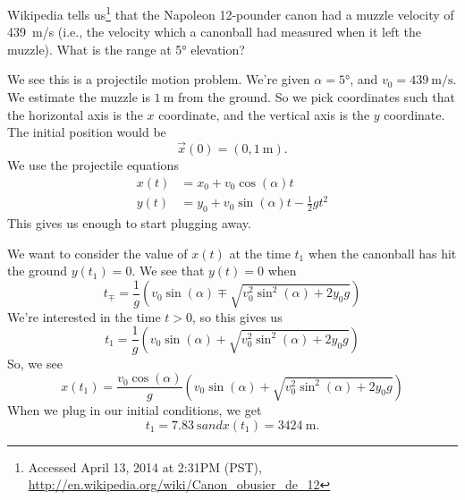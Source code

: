 Wikipedia tells us\footnote{Accessed April 13, 2014 at 2:31PM (PST), \url{http://en.wikipedia.org/wiki/Canon_obusier_de_12}}
that the Napoleon 12-pounder canon had a muzzle velocity of
\SI{439}{\meter/\second} (i.e., the velocity which a canonball had
measured when it left the muzzle). What is the range at \ang{5} elevation?

\begin{soln}
\IDandSETUP
We see this is a projectile motion
problem. We're given $\alpha=\ang{5}$, and
$v_{0}=\SI{439}{\meter/\second}$. We estimate the muzzle is
$\SI{1}{\meter}$ from the ground. So we pick coordinates such that the
horizontal axis is the $x$ coordinate, and the vertical axis is the $y$
coordinate. The initial position would be
\begin{equation}
\vec{x}(0)=(0,\SI{1}{\meter}).
\end{equation}
We use the projectile equations
\begin{equation*}
\begin{split}
x(t) &= x_{0} + v_{0}\cos(\alpha)t\\
y(t) &= y_{0} + v_{0}\sin(\alpha)t - \frac{1}{2}gt^{2}
\end{split}
\end{equation*}
This gives us enough to start plugging away.

\EXECUTE
We want to consider the value of $x(t)$ at the time $t_{1}$ when the
canonball has hit the ground $y(t_{1})=0$. We see that $y(t)=0$ when
\begin{equation}
t_{\mp} = \frac{1}{g}\left(v_{0}\sin(\alpha)
         \mp\sqrt{v_{0}^{2}\sin^{2}(\alpha) + 2y_{0}g}\right)
\end{equation}
We're interested in the time $t>0$, so this gives us
\begin{equation}
t_{1} = \frac{1}{g}\left(v_{0}\sin(\alpha)
         + \sqrt{v_{0}^{2}\sin^{2}(\alpha) + 2y_{0}g}\right)
\end{equation}
So, we see
\begin{equation}
x(t_{1}) = \frac{v_{0}\cos(\alpha)}{g}\left(v_{0}\sin(\alpha)
         + \sqrt{v_{0}^{2}\sin^{2}(\alpha) + 2y_{0}g}\right)
\end{equation}
When we plug in our initial conditions, we get
\begin{subequations}
\begin{equation}
t_{1}=\SI{7.83}{\second}
\end{equation}
and
\begin{equation}
x(t_{1})=\SI{3424}{\meter}.
\end{equation}
\end{subequations}


\end{soln}
